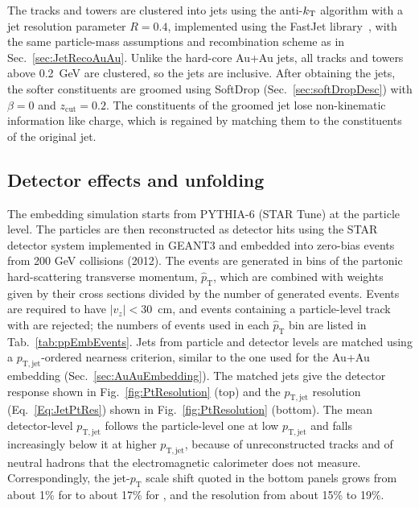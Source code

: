  The tracks and towers are clustered into jets using the anti-\(k_{\rm T}\) algorithm with a jet resolution parameter $R = 0.4$, implemented using the FastJet library~\cite{Cacciari:2011ma}, with the same particle-mass assumptions and recombination scheme as in Sec.~\ref{sec:JetRecoAuAu}. Unlike the hard-core Au+Au jets, all tracks and towers above 0.2~GeV are clustered, so the jets are inclusive.  After obtaining the jets, the softer constituents are groomed using SoftDrop (Sec.~\ref{sec:softDropDesc}) with \(\beta = 0\) and \(z_\mathrm{cut} = 0.2\). The constituents of the groomed jet lose non-kinematic information like charge, which is regained by matching them to the constituents of the original jet. 
 
 \subsection{Detector effects and unfolding}
 \label{sec:ppUnfolding}
 The embedding simulation starts from PYTHIA\mbox{-}6 (STAR Tune)  at the particle level. The particles are then reconstructed as detector hits using the STAR detector system implemented in GEANT3 and embedded into zero-bias events from 200 GeV \pp collisions (2012). The events are generated in bins of the partonic hard-scattering transverse momentum, \(\hat{p}_\mathrm{T}\), which are combined with weights given by their cross sections divided by the number of generated events. Events are required to have \(|v_z| < 30\)~cm, and events containing a particle-level track with  are rejected; the numbers of events used in each \(\hat{p}_\mathrm{T}\) bin are listed in Tab.~\ref{tab:ppEmbEvents}. Jets from particle and detector levels are matched using a \(p_\mathrm{T, jet}\)-ordered nearness criterion, similar to the one used for the Au+Au embedding (Sec.~\ref{sec:AuAuEmbedding}).  The matched jets give the detector response shown in Fig.~\ref{fig:PtResolution} (top) and the \(p_\mathrm{T, jet}\) resolution (Eq.~\ref{Eq:JetPtRes}) shown in Fig.~\ref{fig:PtResolution} (bottom). The mean detector-level \(p_\mathrm{T, jet}\) follows the particle-level one at low \(p_\mathrm{T, jet}\) and falls increasingly below it at higher \(p_\mathrm{T, jet}\), because of unreconstructed tracks and of neutral hadrons that the electromagnetic calorimeter does not measure. Correspondingly, the jet-\(p_\mathrm{T}\) scale shift quoted in the bottom panels grows from about 1\% for  to about 17\% for , and the resolution from about 15\% to 19\%.  

